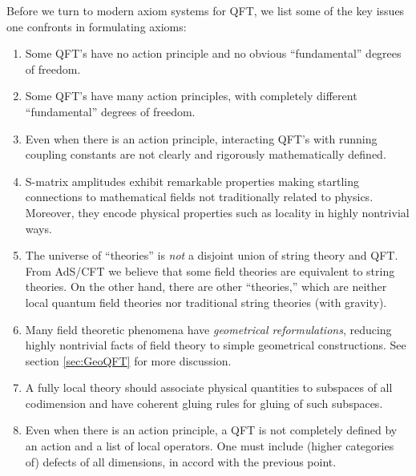 \documentclass[12pt]{article}
\begin{document}
Before we turn to modern axiom systems for QFT, we list some of the key
issues one confronts in formulating axioms:


\begin{enumerate}

\item Some QFT's have no action principle and no obvious
``fundamental'' degrees of freedom.

\item Some QFT's have many action principles, with completely
different ``fundamental'' degrees of freedom.

\item Even when there is an action principle, interacting QFT's with
running coupling constants are not clearly and rigorously mathematically
defined.

\item S-matrix amplitudes exhibit remarkable properties making startling connections
to mathematical fields not traditionally related to physics. Moreover, they  encode
physical properties such as locality in highly nontrivial ways.

\item The universe of  ``theories'' is \emph{not} a disjoint union of string
theory and QFT. From AdS/CFT we believe that some field theories are equivalent
to string theories. On the other hand, there are other ``theories,'' which are
neither local quantum field theories nor traditional string theories (with gravity).

\item Many field theoretic phenomena have \emph{geometrical reformulations},
reducing highly nontrivial facts of field theory to simple geometrical
constructions.  See section \ref{sec:GeoQFT} for more discussion. 

\item A fully local theory should associate physical quantities to subspaces
of all codimension and have coherent gluing rules for gluing of such
subspaces.

\item Even when there is an action principle, a QFT is not completely defined
by an action and a list of local operators. One must include (higher
categories of) defects of all dimensions, in accord with the previous point. 

\end{enumerate}
\end{document}
